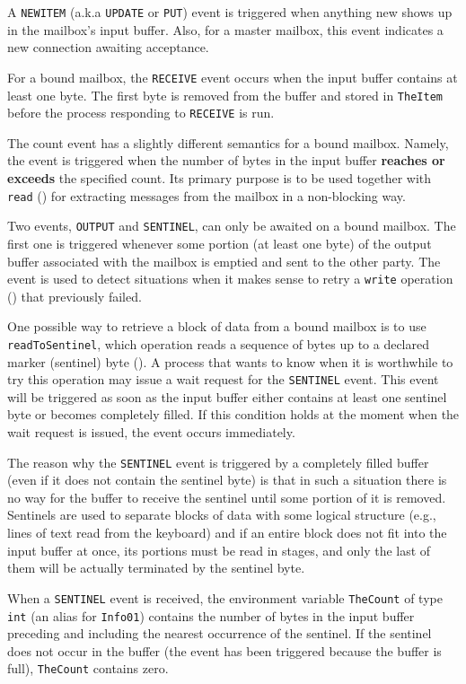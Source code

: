 A {\tt NEWITEM} (a.k.a {\tt UPDATE} or {\tt PUT})
event is triggered when anything new shows up in the mailbox's input
buffer.
Also, for a master mailbox, this event indicates a new connection awaiting
acceptance.

For a bound mailbox, the {\tt RECEIVE} event occurs when the input
buffer contains at least one byte.
The first byte is removed from the buffer and stored in {\tt TheItem}
before the process responding to {\tt RECEIVE} is run.

The count event has a slightly different semantics for a bound mailbox.
Namely, the event is triggered when the number of bytes in the input buffer
{\bf reaches or exceeds} the specified count.
Its primary purpose is to be used together with {\tt read} ()
for extracting messages from the mailbox in a non-blocking way.

Two events, {\tt OUTPUT} and {\tt SENTINEL},
can only be awaited on a bound mailbox.
The first one
is triggered whenever some portion (at least one byte) of the output buffer
associated with the mailbox is emptied and sent to the other party.
The event is used to detect situations when it makes sense to retry a
{\tt write} operation () that previously failed.

One possible way to retrieve a block of data from a bound mailbox is to
use {\tt readToSentinel}, which operation reads a sequence of bytes up
to a declared marker (sentinel) byte ().
A process that wants to know when it is worthwhile to try this operation
may issue a wait request for the {\tt SENTINEL} event.
This event will be triggered as soon as the input buffer either contains at
least one sentinel byte or becomes completely filled.
If this condition holds at the moment when the wait request is issued,
the event occurs immediately.

The reason why the {\tt SENTINEL} event is triggered by a completely
filled buffer (even if it does not contain the sentinel byte) is that
in such a situation there is no way for the buffer to receive the sentinel
until some portion of it is removed.
Sentinels are used to separate blocks of data with some logical structure
(e.g., lines of text read from the keyboard) and if an entire block
does not fit into the input buffer at once, its portions must be read
in stages, and only the last of them will be actually terminated by
the sentinel byte.

When a {\tt SENTINEL} event is received, the environment variable
{\tt TheCount} of type {\tt int} (an alias for {\tt Info01}) contains
the number of bytes in the input buffer preceding and including the
nearest occurrence of the sentinel.
If the sentinel does not occur in the buffer (the event has been
triggered because the buffer is full), {\tt TheCount} contains zero.

